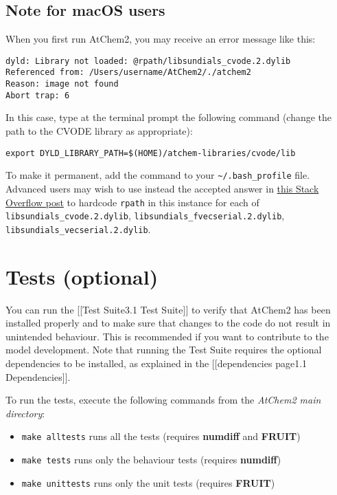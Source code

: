 \subsection{Note for macOS users} \label{subsec:note-for-macos-users}

When you first run AtChem2, you may receive an error message like
this:

\begin{verbatim}
dyld: Library not loaded: @rpath/libsundials_cvode.2.dylib
Referenced from: /Users/username/AtChem2/./atchem2
Reason: image not found
Abort trap: 6
\end{verbatim}

In this case, type at the terminal prompt the following command
(change the path to the CVODE library as appropriate):

\begin{verbatim}
export DYLD_LIBRARY_PATH=$(HOME)/atchem-libraries/cvode/lib
\end{verbatim}

To make it permanent, add the command to your
\texttt{\textasciitilde{}/.bash\_profile} file. Advanced users may
wish to use instead the accepted answer in
\href{https://stackoverflow.com/questions/17703510/dyld-library-not-loaded-reason-image-not-loaded}{this
  Stack Overflow post} to hardcode \texttt{rpath} in this instance for
each of \texttt{libsundials\_cvode.2.dylib},
\texttt{libsundials\_fvecserial.2.dylib},
\texttt{libsundials\_vecserial.2.dylib}.

\section{Tests (optional)} \label{sec:tests}

You can run the {[}{[}Test Suite\textbar{}3.1 Test Suite{]}{]} to
verify that AtChem2 has been installed properly and to make sure that
changes to the code do not result in unintended behaviour. This is
recommended if you want to contribute to the model development. Note
that running the Test Suite requires the optional dependencies to be
installed, as explained in the {[}{[}dependencies page\textbar{}1.1
Dependencies{]}{]}.

To run the tests, execute the following commands from the
\emph{AtChem2 main directory}:

\begin{itemize}
\item \texttt{make\ alltests} runs all the tests (requires
  \textbf{numdiff} and \textbf{FRUIT})
\item \texttt{make\ tests} runs only the behaviour tests (requires
  \textbf{numdiff})
\item \texttt{make\ unittests} runs only the unit tests (requires
  \textbf{FRUIT})
\end{itemize}

